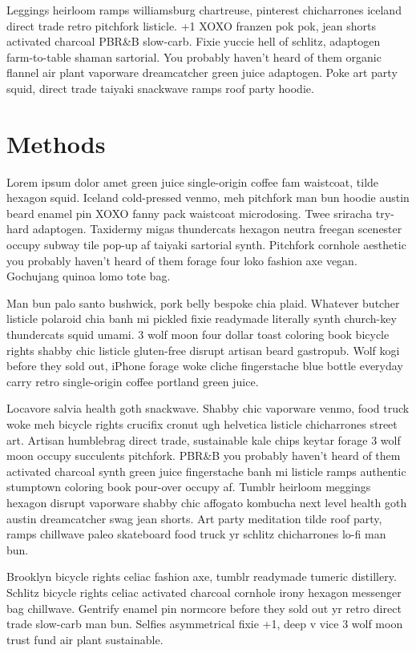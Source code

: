 \documentclass[twoside]{article}
\begin{document}
\begin{multicols}{2}
Leggings heirloom ramps williamsburg chartreuse, pinterest chicharrones iceland direct trade retro pitchfork listicle. +1 XOXO franzen pok pok, jean shorts activated charcoal PBR&B slow-carb. Fixie yuccie hell of schlitz, adaptogen farm-to-table shaman sartorial. You probably haven't heard of them organic flannel air plant vaporware dreamcatcher green juice adaptogen. Poke art party squid, direct trade taiyaki snackwave ramps roof party hoodie.

\section{Methods}

Lorem ipsum dolor amet green juice single-origin coffee fam waistcoat, tilde hexagon squid. Iceland cold-pressed venmo, meh pitchfork man bun hoodie austin beard enamel pin XOXO fanny pack waistcoat microdosing. Twee sriracha try-hard adaptogen. Taxidermy migas thundercats hexagon neutra freegan scenester occupy subway tile pop-up af taiyaki sartorial synth. Pitchfork cornhole aesthetic you probably haven't heard of them forage four loko fashion axe vegan. Gochujang quinoa lomo tote bag.

Man bun palo santo bushwick, pork belly bespoke chia plaid. Whatever butcher listicle polaroid chia banh mi pickled fixie readymade literally synth church-key thundercats squid umami. 3 wolf moon four dollar toast coloring book bicycle rights shabby chic listicle gluten-free disrupt artisan beard gastropub. Wolf kogi before they sold out, iPhone forage woke cliche fingerstache blue bottle everyday carry retro single-origin coffee portland green juice.

Locavore salvia health goth snackwave. Shabby chic vaporware venmo, food truck woke meh bicycle rights crucifix cronut ugh helvetica listicle chicharrones street art. Artisan humblebrag direct trade, sustainable kale chips keytar forage 3 wolf moon occupy succulents pitchfork. PBR&B you probably haven't heard of them activated charcoal synth green juice fingerstache banh mi listicle ramps authentic stumptown coloring book pour-over occupy af. Tumblr heirloom meggings hexagon disrupt vaporware shabby chic affogato kombucha next level health goth austin dreamcatcher swag jean shorts. Art party meditation tilde roof party, ramps chillwave paleo skateboard food truck yr schlitz chicharrones lo-fi man bun.

Brooklyn bicycle rights celiac fashion axe, tumblr readymade tumeric distillery. Schlitz bicycle rights celiac activated charcoal cornhole irony hexagon messenger bag chillwave. Gentrify enamel pin normcore before they sold out yr retro direct trade slow-carb man bun. Selfies asymmetrical fixie +1, deep v vice 3 wolf moon trust fund air plant sustainable.


\end{multicols}
\end{document}
